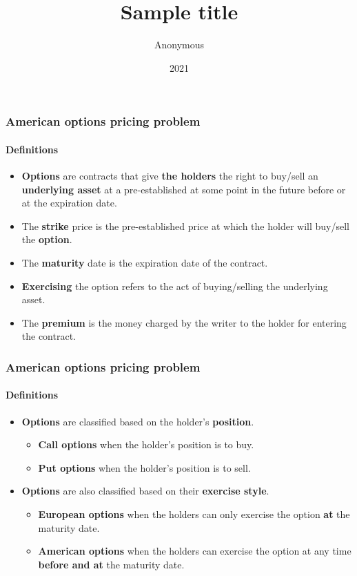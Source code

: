 \documentclass{beamer}
\title{Sample title}
\author{Anonymous}
\institute{Overleaf}
\date{2021}
\begin{document}
\frame{\titlepage}

\begin{frame}
\frametitle{American options pricing problem}
\framesubtitle{Definitions}

\begin{itemize}
    \item \textbf{Options} are contracts that give \textbf{the holders} the right to buy/sell an \textbf{underlying asset} at a pre-established at some point in the future before or at the expiration date.
    
    \item The \textbf{strike} price is the pre-established price at which the holder will buy/sell the \textbf{option}.

    \item The \textbf{maturity} date is the expiration date of the contract.

    \item \textbf{Exercising} the option refers to the act of buying/selling the underlying asset.

    \item The \textbf{premium} is the money charged by the writer to the holder for entering the contract.
\end{itemize}

\end{frame}

\begin{frame}
\frametitle{American options pricing problem}
\framesubtitle{Definitions}

\begin{itemize}
    \item \textbf{Options} are classified based on the holder's \textbf{position}.
    \begin{itemize}
        \item \textbf{Call options} when the holder's position is to buy.
        \item \textbf{Put options} when the holder's position is to sell.
    \end{itemize}
    
    \item \textbf{Options} are also classified based on their \textbf{exercise style}.
    \begin{itemize}
        \item \textbf{European options} when the holders can only exercise the option \textbf{at} the maturity date. 
        \item \textbf{American options} when the holders can exercise the option at any time \textbf{before and at} the maturity date. 
    \end{itemize}
\end{itemize}

\end{frame}
\end{document}
